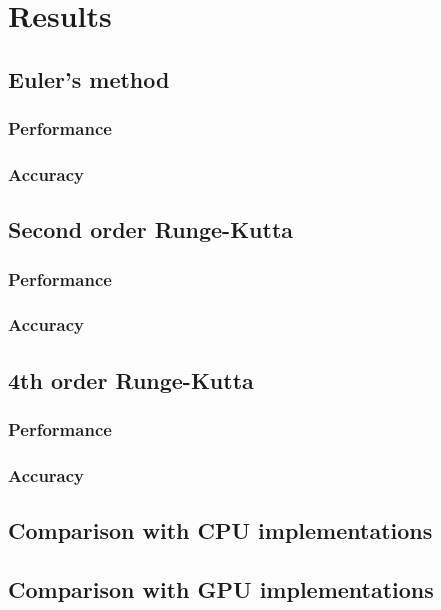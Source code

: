 
\chapter{Results}

\section{Euler's method}

\subsection{Performance}
\subsection{Accuracy}

\section{Second order Runge-Kutta}

\subsection{Performance}
\subsection{Accuracy}

\section{4th order Runge-Kutta}

\subsection{Performance}
\subsection{Accuracy}

\section{Comparison with CPU implementations}

\section{Comparison with GPU implementations}






